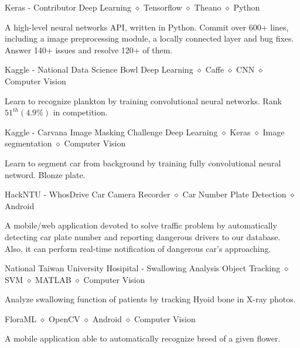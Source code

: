 \documentclass{joel_cv}
\begin{document}
%
%


\begin{proj}{Keras - Contributor}
	{Deep Learning $\diamond$ Tensorflow $\diamond$ Theano $\diamond$ Python}
	\item A high-level neural networks API, written in Python. Commit over 600+ lines, including a image preprocessing module, a locally connected layer and bug fixes. Answer 140+ issues and resolve 120+ of them.
\end{proj}

\begin{proj}{Kaggle - National Data Science Bowl}
	{Deep Learning $\diamond$ Caffe $\diamond$ CNN $\diamond$ Computer Vision}
	\item Learn to recognize plankton by training convolutional neural networks. Rank $51^{th} (4.9\%)$ in competition.
\end{proj}

\begin{proj}{Kaggle - Carvana Image Masking Challenge}
	{Deep Learning $\diamond$ Keras $\diamond$ Image segmentation $\diamond$ Computer Vision}
	\item Learn to segment car from background by training fully convolutional neural netword. Blonze plate.
\end{proj}

\begin{proj}{HackNTU - WhosDrive}
	{Car Camera Recorder $\diamond$ Car Number Plate Detection $\diamond$ Android}
	\item A mobile/web application devoted to solve traffic problem by automatically detecting car plate number and reporting dangerous drivers to our database. Also, it can perform real-time notification of dangerous car's approaching.
\end{proj}

\begin{proj}{National Taiwan University Hosipital - Swallowing Analysis}
	{Object Tracking $\diamond$ SVM $\diamond$ MATLAB $\diamond$ Computer Vision}
	\item Analyze swallowing function of patients by tracking Hyoid bone in X-ray photos.
\end{proj}

\begin{proj}{Flora}{ML $\diamond$ OpenCV $\diamond$ Android $\diamond$ Computer Vision}
	\item A mobile application able to automatically recognize breed of a given flower.
\end{proj}
\end{document}

